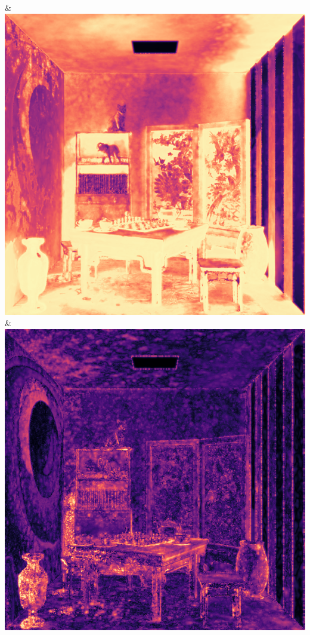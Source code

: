 & \includegraphics[width=\linewidth]{figures/py/tests/quality_comparison/nrc+lt_1spp_chess_flip.png}
& \includegraphics[width=\linewidth]{figures/py/tests/quality_comparison/nrc+sppc_1spp_chess_flip.png}
